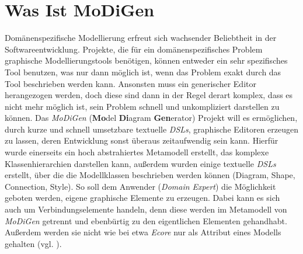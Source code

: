 \section{Was Ist MoDiGen}\label{modigen}
Domänenspezifische Modellierung erfreut sich wachsender Beliebtheit in der Softwareentwicklung. Projekte, die für ein domänenspezifisches Problem graphische Modellierungstools benötigen, können entweder ein sehr spezifisches Tool benutzen, was nur dann möglich ist, wenn das Problem exakt durch das Tool beschrieben werden kann. Ansonsten muss ein generischer Editor herangezogen werden, doch diese sind dann in der Regel derart komplex, dass es nicht mehr möglich ist, sein Problem schnell und unkompliziert darstellen zu können. Das \textit{MoDiGen} (\textbf{Mo}del \textbf{Di}agram \textbf{Gen}erator) Projekt will es ermöglichen, durch kurze und schnell umsetzbare textuelle \textit{DSLs}, graphische Editoren erzeugen zu lassen, deren Entwicklung sonst überaus zeitaufwendig sein kann. Hierfür wurde einerseits ein hoch abstrahiertes Metamodell erstellt, das komplexe Klassenhierarchien darstellen kann, außerdem wurden einige textuelle \textit{DSLs} erstellt, über die die Modellklassen beschrieben werden können (Diagram, Shape, Connection, Style). So soll dem Anwender (\textit{Domain Expert}) die Möglichkeit geboten werden, eigene graphische Elemente zu erzeugen. Dabei kann es sich auch um Verbindungselemente handeln, denn diese werden im Metamodell von \textit{MoDiGen} getrennt und ebenbürtig zu den eigentlichen Elementen gehandhabt. Außerdem werden sie nicht wie bei etwa \textit{Ecore} nur als Attribut eines Modells gehalten (vgl. \citet{gerhart:modigen_concept}).
